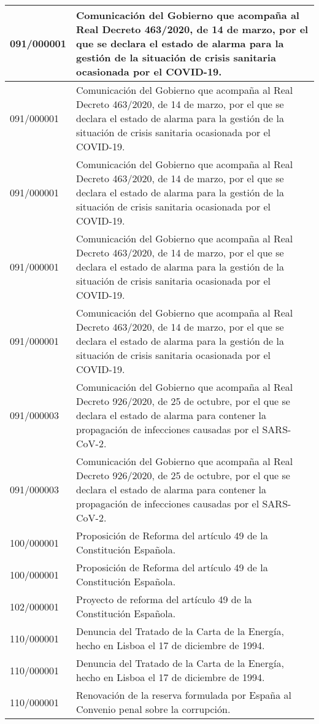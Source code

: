 {\begin{table}[H]
\begin{center}
\begin{tabularx}{\linewidth}{| l | X |}
\hline
091/000001 & Comunicación del Gobierno que acompaña al Real Decreto 463/2020, de 14 de marzo, por el que se declara el estado de alarma para la gestión de la situación de crisis sanitaria ocasionada por el COVID-19. \\
\hline
091/000001 & Comunicación del Gobierno que acompaña al Real Decreto 463/2020, de 14 de marzo, por el que se declara el estado de alarma para la gestión de la situación de crisis sanitaria ocasionada por el COVID-19. \\
\hline
091/000001 & Comunicación del Gobierno que acompaña al Real Decreto 463/2020, de 14 de marzo, por el que se declara el estado de alarma para la gestión de la situación de crisis sanitaria ocasionada por el COVID-19. \\
\hline
091/000001 & Comunicación del Gobierno que acompaña al Real Decreto 463/2020, de 14 de marzo, por el que se declara el estado de alarma para la gestión de la situación de crisis sanitaria ocasionada por el COVID-19. \\
\hline
091/000001 & Comunicación del Gobierno que acompaña al Real Decreto 463/2020, de 14 de marzo, por el que se declara el estado de alarma para la gestión de la situación de crisis sanitaria ocasionada por el COVID-19. \\
\hline
091/000003 & Comunicación del Gobierno que acompaña al Real Decreto 926/2020, de 25 de octubre, por el que se declara el estado de alarma para contener la propagación de infecciones causadas por el SARS-CoV-2. \\
\hline
091/000003 & Comunicación del Gobierno que acompaña al Real Decreto 926/2020, de 25 de octubre, por el que se declara el estado de alarma para contener la propagación de infecciones causadas por el SARS-CoV-2. \\
\hline
100/000001 & Proposición de Reforma del artículo 49 de la Constitución Española. \\
\hline
100/000001 & Proposición de Reforma del artículo 49 de la Constitución Española. \\
\hline
102/000001 & Proyecto de reforma del artículo 49 de la Constitución Española. \\
\hline
110/000001 & Denuncia del Tratado de la Carta de la Energía, hecho en Lisboa el 17 de diciembre de 1994. \\
\hline
110/000001 & Denuncia del Tratado de la Carta de la Energía, hecho en Lisboa el 17 de diciembre de 1994. \\
\hline
110/000001 & Renovación de la reserva formulada por España al Convenio penal sobre la corrupción. \\

\end{tabularx}
\end{center}
\end{table}}
